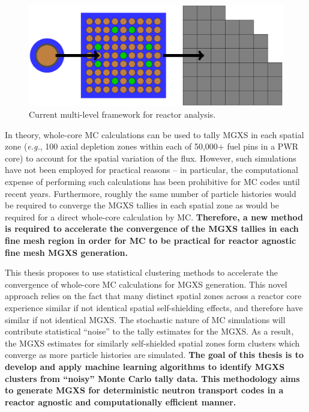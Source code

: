 \documentclass[12pt,twoside]{mitthesis-exec}
\begin{document}
\begin{figure}[h!]
\centering
\includegraphics[width=0.9\linewidth]{figures/intro/multi-step-flow-chart}
\caption[Multi-level approach to reactor analysis]{Current multi-level framework for reactor analysis.}
\label{fig:multi-level-flow-chart}
\end{figure}

In theory, whole-core MC calculations can be used to tally MGXS in each spatial zone (\textit{e.g.}, 100 axial depletion zones within each of 50,000+ fuel pins in a PWR core) to account for the spatial variation of the flux. However, such simulations have not been employed for practical reasons -- in particular, the computational expense of performing such calculations has been prohibitive for MC codes until recent years. Furthermore, roughly the same number of particle histories would be required to converge the MGXS tallies in each spatial zone as would be required for a direct whole-core calculation by MC. \textbf{Therefore, a new method is required to accelerate the convergence of the MGXS tallies in each fine mesh region in order for MC to be practical for reactor agnostic fine mesh MGXS generation.}

This thesis proposes to use statistical clustering methods to accelerate the convergence of whole-core MC calculations for MGXS generation. This novel approach relies on the fact that many distinct spatial zones across a reactor core experience similar if not identical spatial self-shielding effects, and therefore have similar if not identical MGXS. The stochastic nature of MC simulations will contribute statistical ``noise'' to the tally estimates for the MGXS. As a result, the MGXS estimates for similarly self-shielded spatial zones form clusters which converge as more particle histories are simulated. \textbf{The goal of this thesis is to develop and apply machine learning algorithms to identify MGXS clusters from ``noisy'' Monte Carlo tally data. This methodology aims to generate MGXS for deterministic neutron transport codes in a reactor agnostic and computationally efficient manner.}
\end{document}
